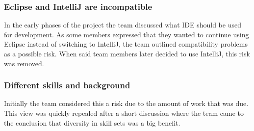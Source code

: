 \subsubsection{Eclipse and IntelliJ are incompatible}
In the early phases of the project the team discussed what IDE should be used for development. As some members expressed that they wanted to continue using Eclipse instead of switching to IntelliJ, the team outlined compatibility problems as a possible risk. When said team members later decided to use IntelliJ, this risk was removed.

\subsubsection{Different skills and background}
Initially the team considered this a risk due to the amount of work that was due. This view was quickly repealed after a short discussion where the team came to the conclusion that diversity in skill sets was a big benefit.

